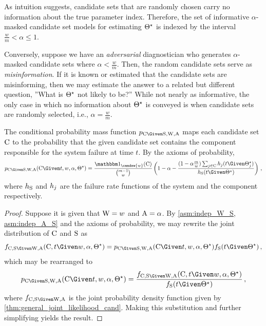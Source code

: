 \documentclass[../main.tex]{subfiles}
\begin{document}
As intuition suggests, candidate sets that are randomly chosen carry no information about the true parameter index.
Therefore, the set of informative $\alpha$-masked candidate set models for estimating ${\Theta}^{\star}$ is indexed by the interval $\frac{w}{m} < \alpha \leq 1$.
\begin{remark}
Conversely, suppose we have an \emph{adversarial} diagnostician who generates $\alpha$-masked candidate sets where $\alpha < \frac{w}{m}$.
Then, the random candidate sets serve as \emph{misinformation}.
If it is known or estimated that the candidate sets are misinforming, then we may estimate the answer to a related but different question, ''What is ${\Theta}^{\star}$ not likely to be?''
While not nearly as informative, the only case in which no information about ${\Theta}^{\star}$ is conveyed is when candidate sets are randomly selected, i.e., $\alpha = \frac{w}{m}$.
\end{remark}


\begin{corollary}
	\label{def:general_cond_cand_probability_alpha}
	The conditional probability mass function $\pmf_{\rvcand \Given \sv, \RV{W}, \RV{A}}$ maps each candidate set $\mathrm{C}$ to the probability that the given candidate set contains the component responsible for the system failure at time $t$.
	By the axioms of probability,
	\begin{equation}
	\label{eq:general_cond_cand_probability_alpha}
	\pmf_{\rvcand \Given \sv, \RV{W}, \RV{A}}(\cand \Given t, w, \alpha, \tparam\sysparam) =
	\frac{\SetIndicator{\candsw{w}}(\cand)}{\binom{m-1}{w}}
	\left(
	1-\alpha -	
	\frac
	{
		(1-\alpha \frac{m}{w}) \sum_{j \in \cand} \haz_j(t \Given \tparam\sysparam_j)
	}
	{
		\haz_{\sv}(t \Given \tparam\sysparam)
	}\right)\,,
	\end{equation}
	where $h_{\mathrm{S}}$ and $h_j$ are the failure rate functions of the system 
	and the \jth component respectively.
\end{corollary}
\begin{proof}
Suppose it is given that $\mathrm{W} = w$ and $\mathrm{A} = \alpha$.
By \cref{asm:indep_W_S, asm:indep_A_S} and the axioms of probability, we may rewrite the joint distribution of $\mathrm{C}$ and $\mathrm{S}$ as
\begin{equation}
\pdf_{\rvcand,\sv \Given \RV{W}, \RV{A}}(\cand, t \Given w, \alpha, \tparam\sysparam) =
\pmf_{\rvcand \Given \sv, \RV{W}, \RV{A}}(\cand \Given t, w, \alpha, \tparam\sysparam) \spdf(t \Given \tparam\sysparam)\,,
\end{equation}
which may be rearranged to
\begin{equation}
\pmf_{\rvcand \Given \sv, \RV{W}, \RV{A}}(\cand \Given t, w, \alpha, \tparam\sysparam) = \frac
{
	\pdf_{\rvcand, \sv \Given \RV{W}, \RV{A}}(\cand, t \Given w, \alpha, \tparam\sysparam)
}
{
	\spdf(t \Given \tparam\sysparam)
}\,,
\end{equation}
where $\pdf_{\rvcand, \sv \Given \RV{W}, \RV{A}}$ is the joint probability density function given by \cref{thm:general_joint_likelihood_cand}.
Making this substitution and further simplifying yields the result.
\end{proof}
\end{document}
